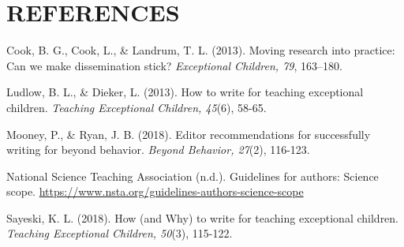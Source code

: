\documentclass[11.5pt]{sig-alternate} %
\begin{document}
\section*{REFERENCES}\par 
\leftskip 0.25in
\parindent -0.25in 

Cook, B. G., Cook, L., \& Landrum, T. L. (2013). Moving research into practice: Can we make dissemination stick? \textit{Exceptional Children, 79}, 163–180.

Ludlow, B. L., \& Dieker, L. (2013). How to write for teaching exceptional children. \textit{Teaching Exceptional Children, 45}(6), 58-65.

Mooney, P., \& Ryan, J. B. (2018). Editor recommendations for successfully writing for beyond behavior. \textit{Beyond Behavior, 27}(2), 116-123.

National Science Teaching Association (n.d.). Guidelines for authors: Science scope. \url{https://www.nsta.org/guidelines-authors-science-scope}

Sayeski, K. L. (2018). How (and Why) to write for teaching exceptional children. \textit{Teaching Exceptional Children, 50}(3), 115-122.
\end{document}
